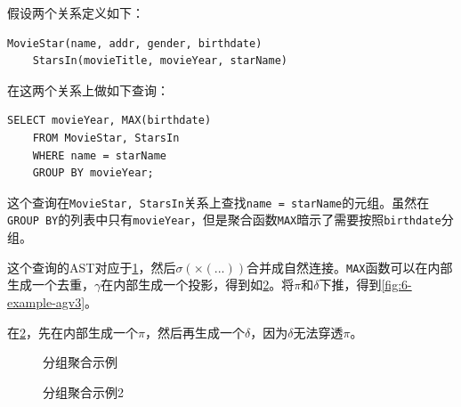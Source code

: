\begin{example}
    假设两个关系定义如下：
\begin{lstlisting}[style=verbose]
    MovieStar(name, addr, gender, birthdate)
    StarsIn(movieTitle, movieYear, starName)
\end{lstlisting}
    在这两个关系上做如下查询：
\begin{lstlisting}[style=verbose]
    SELECT movieYear, MAX(birthdate)
    FROM MovieStar, StarsIn
    WHERE name = starName
    GROUP BY movieYear;
\end{lstlisting}
    这个查询在\texttt{MovieStar, StarsIn}关系上查找\texttt{name = starName}的元组。虽然在\texttt{GROUP BY}的列表中只有\texttt{movieYear}，但是聚合函数\texttt{MAX}暗示了需要按照\texttt{birthdate}分组。

    这个查询的AST对应于\figurename\ref{fig:6-example-agv}，然后$\sigma(\times(...))$合并成自然连接。\texttt{MAX}函数可以在内部生成一个去重，$\gamma$在内部生成一个投影，得到如\figurename\ref{fig:6-example-agv2}。将$\pi$和$\delta$下推，得到\figurename\ref{fig:6-example-agv3}。

    在\figurename\ref{fig:6-example-agv2}，先在内部生成一个$\pi$，然后再生成一个$\delta$，因为$\delta$无法穿透$\pi$。
\end{example}

\begin{figure}[H]
    \centering
    \caption{分组聚合示例}\label{fig:6-example-agv}
\end{figure}

\begin{figure}[H]
    \centering
    \caption{分组聚合示例2}\label{fig:6-example-agv2}
\end{figure}

